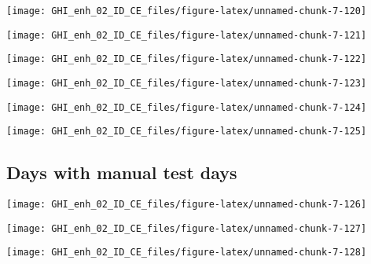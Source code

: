 \documentclass[
  10pt,
  a4paper,oneside]{article}
\begin{document}
\begin{center}\texttt{[image: GHI\_enh\_02\_ID\_CE\_files/figure-latex/unnamed-chunk-7-120]} \end{center}

\begin{center}\texttt{[image: GHI\_enh\_02\_ID\_CE\_files/figure-latex/unnamed-chunk-7-121]} \end{center}

\begin{center}\texttt{[image: GHI\_enh\_02\_ID\_CE\_files/figure-latex/unnamed-chunk-7-122]} \end{center}

\begin{center}\texttt{[image: GHI\_enh\_02\_ID\_CE\_files/figure-latex/unnamed-chunk-7-123]} \end{center}

\begin{center}\texttt{[image: GHI\_enh\_02\_ID\_CE\_files/figure-latex/unnamed-chunk-7-124]} \end{center}

\begin{center}\texttt{[image: GHI\_enh\_02\_ID\_CE\_files/figure-latex/unnamed-chunk-7-125]} \end{center}

\FloatBarrier

\hypertarget{days-with-manual-test-days}{%
\subsection{Days with manual test days}\label{days-with-manual-test-days}}

\begin{center}\texttt{[image: GHI\_enh\_02\_ID\_CE\_files/figure-latex/unnamed-chunk-7-126]} \end{center}

\begin{center}\texttt{[image: GHI\_enh\_02\_ID\_CE\_files/figure-latex/unnamed-chunk-7-127]} \end{center}

\begin{center}\texttt{[image: GHI\_enh\_02\_ID\_CE\_files/figure-latex/unnamed-chunk-7-128]} \end{center}

\newpage
\FloatBarrier
\end{document}
